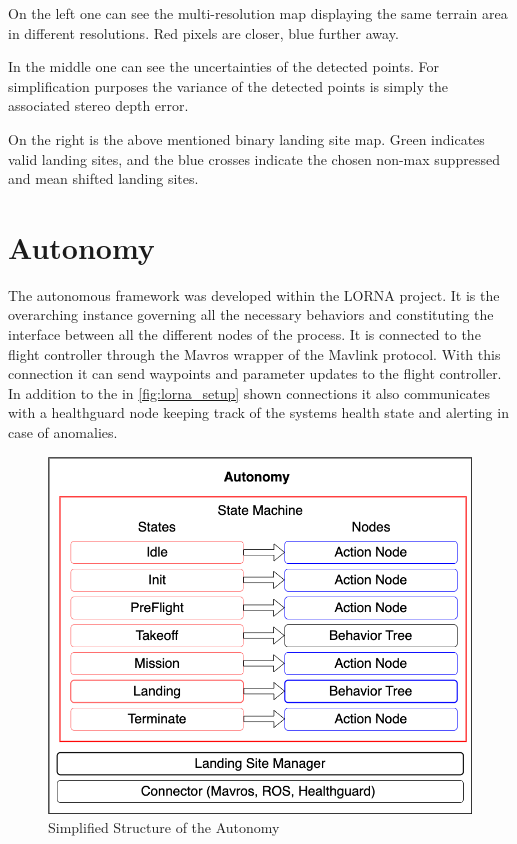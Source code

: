 On the left one can see the multi-resolution map displaying the same terrain area in different resolutions. Red pixels are closer, blue further away.

In the middle one can see the uncertainties of the detected points. For simplification purposes the variance of the detected points is simply the associated stereo depth error.

On the right is the above mentioned binary landing site map. Green indicates valid landing sites, and the blue crosses indicate the chosen non-max suppressed and mean shifted landing sites.

\section{Autonomy}\label{sec:setup:autonomy}

The autonomous framework was developed within the LORNA project. It is the overarching instance governing all the necessary behaviors and constituting the interface between all the different nodes of the process. It is connected to the flight controller through the Mavros wrapper of the Mavlink protocol. With this connection it can send waypoints and parameter updates to the flight controller.
In addition to the in \cref{fig:lorna_setup} shown connections it also communicates with a healthguard node keeping track of the systems health state and alerting in case of anomalies.

\begin{figure}[ht!]
    \centering
    \includegraphics[scale=0.45]{images/setup/autonomy.png}
    \caption{Simplified Structure of the Autonomy}
    \label{fig:autonomy}
\end{figure}

